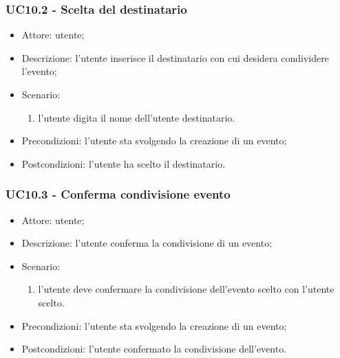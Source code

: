 \subsubsection{UC10.2 - Scelta del destinatario}
\begin{itemize}
    \item Attore: utente;
    \item Descrizione: l'utente inserisce il destinatario con cui desidera condividere l'evento;
    \item Scenario:
        \begin{enumerate}
        \item l'utente digita il nome dell'utente destinatario.
        \end{enumerate}
    
    \item Precondizioni: l'utente sta svolgendo la creazione di un evento;
    \item Postcondizioni: l'utente ha scelto il destinatario.
\end{itemize}


\subsubsection{UC10.3 - Conferma condivisione evento}
\begin{itemize}
    \item Attore: utente;
    \item Descrizione: l'utente conferma la condivisione di un evento;
    \item Scenario:
        \begin{enumerate}
        \item l'utente deve confermare la condivisione dell'evento scelto con l'utente scelto.
        \end{enumerate}
    
    \item Precondizioni: l'utente sta svolgendo la creazione di un evento;
    \item Postcondizioni: l'utente confermato la condivisione dell'evento.
\end{itemize}


